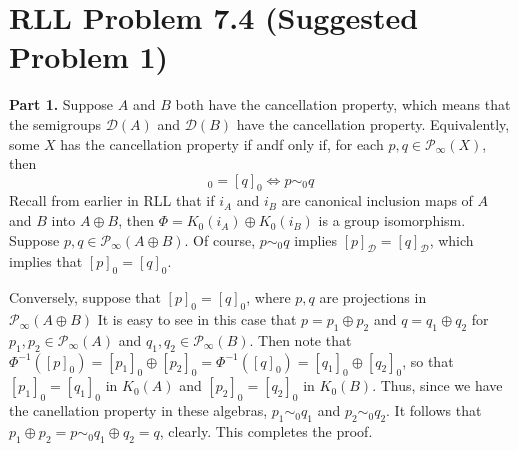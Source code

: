 \documentclass[aps,pra,showpacs,notitlepage,onecolumn,superscriptaddress,nofootinbib]{revtex4-1}
\theoremstyle{definition}
\newtheorem{theorem}{Theorem}[section]
\begin{document}
\begin{comment}
\section{Main result}

\noindent With our preliminary lemmas, we can now attempt to prove the main result.

\begin{theorem}

\end{theorem}
\end{comment}

\section{RLL Problem 7.4 (Suggested Problem 1)}

\noindent \textbf{Part 1.} Suppose $A$ and $B$ both have the cancellation property, which means that the semigroups $\mathcal{D}(A)$ and $\mathcal{D}(B)$ have the cancellation property.
Equivalently, some $X$ has the cancellation property if andf only if, for each $p, q \in \mathcal{P}_{\infty}(X)$, then
\begin{equation}
  [p]_0 = [q]_0 \Longleftrightarrow p \sim_0 q
\end{equation}
Recall from earlier in RLL that if $i_A$ and $i_B$ are canonical inclusion maps of $A$ and $B$ into $A \oplus B$, then $\Phi = K_0(i_A) \oplus K_0(i_B)$ is a group isomorphism.
Suppose $p, q \in \mathcal{P}_{\infty}(A \oplus B)$. Of course, $p \sim_0 q$ implies $[p]_{\mathcal{D}} = [q]_{\mathcal{D}}$, which implies that $[p]_{0} = [q]_{0}$.

Conversely, suppose
that $[p]_0 = [q]_0$, where $p, q$ are projections in $\mathcal{P}_{\infty}(A \oplus B)$ It is easy to see in this case that $p = p_1 \oplus p_2$ and $q = q_1 \oplus q_2$ for $p_1, p_2 \in \mathcal{P}_{\infty}(A)$ and $q_1, q_2 \in \mathcal{P}_{\infty}(B)$.
Then note that $\Phi^{-1}([p]_0) = [p_1]_0 \oplus [p_2]_0 = \Phi^{-1}([q]_0) = [q_1]_0 \oplus [q_2]_0$, so that $[p_1]_0 = [q_1]_0$ in $K_0(A)$ and $[p_2]_0 = [q_2]_0$ in $K_0(B)$. Thus, since
we have the canellation property in these algebras, $p_1 \sim_0 q_1$ and $p_2 \sim_0 q_2$. It follows that $p_1 \oplus p_2 = p \sim_0 q_1 \oplus q_2 = q$, clearly. This completes the proof.
\newline
\end{document}
